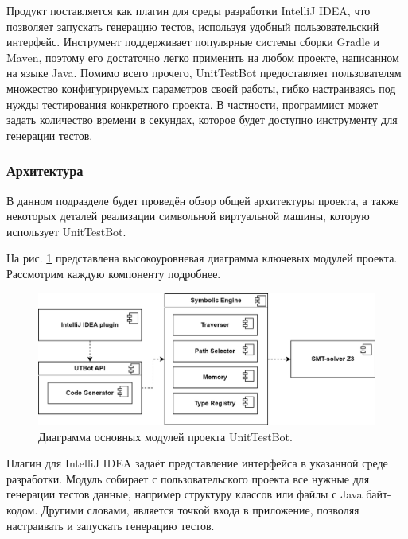 Продукт поставляется как плагин для среды разработки IntelliJ IDEA, что позволяет запускать генерацию тестов, используя удобный пользовательский интерфейс. Инструмент поддерживает популярные системы сборки Gradle и Maven, поэтому его достаточно легко применить на любом проекте, написанном на языке Java. Помимо всего прочего, UnitTestBot предоставляет пользователям множество конфигурируемых параметров своей работы, гибко настраиваясь под нужды тестирования конкретного проекта. В частности, программист может задать количество времени в секундах, которое будет доступно инструменту для генерации тестов.

\subsubsection{Архитектура}\label{sec-utbot-arch}

В данном подразделе будет проведён обзор общей архитектуры проекта, а также некоторых деталей реализации символьной виртуальной машины, которую использует UnitTestBot.

На рис. \ref{utbot-arch} представлена высокоуровневая диаграмма ключевых модулей проекта. 
Рассмотрим каждую компоненту подробнее.

\begin{figure}[ht]
    \includegraphics[scale=0.35]{images/utbot-arch-200.png}
    \caption{\label{utbot-arch} Диаграмма основных модулей проекта UnitTestBot.}
\end{figure}

Плагин для IntelliJ IDEA задаёт представление интерфейса в указанной среде разработки. Модуль собирает с пользовательского проекта все нужные для генерации тестов данные, например структуру классов или файлы с Java байт-кодом. Другими словами, является точкой входа в приложение, позволяя настраивать и запускать генерацию тестов.

